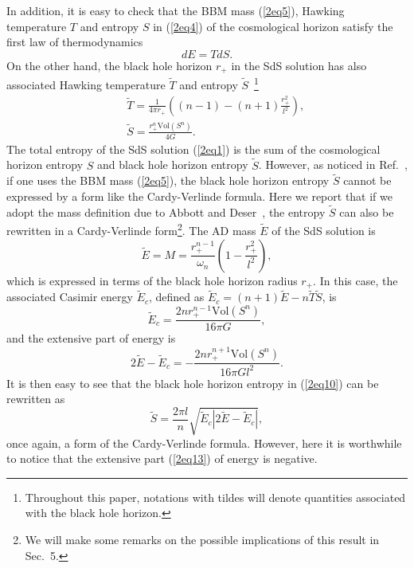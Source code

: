 \documentclass[a4paper,12pt]{article}
\begin{document}
In addition, it is easy to check that the BBM mass (\ref{2eq5}), Hawking temperature $T$
and entropy $S$ in (\ref{2eq4}) of the cosmological horizon satisfy the first law of 
thermodynamics 
\begin{equation}
\label{2eq9}
dE=TdS.
\end{equation}
On the other hand, the black hole horizon $r_+$ in the SdS solution has also associated 
Hawking temperature $\tilde T$ and entropy $\tilde S$~\footnote{Throughout this paper,
notations with tildes will denote quantities associated with the black hole horizon.}
\begin{eqnarray}
\label{2eq10}
&& \tilde T=\frac{1}{4\pi r_+}\left ( (n-1) -(n+1)\frac{r_+^2}{l^2}\right), 
   \nonumber \\
&& \tilde S=\frac{r_+^n \mbox{Vol}(S^n)}{4G}.
\end{eqnarray}
The total entropy of the SdS solution (\ref{2eq1}) is the sum of the cosmological
horizon entropy $S$ and black hole horizon entropy $\tilde S$. However, as noticed
in Ref.~\cite{Cai1}, if one uses the BBM mass (\ref{2eq5}), the black hole horizon entropy
$\tilde S$ cannot be expressed by a form like the Cardy-Verlinde formula. Here we report
that if we adopt the mass definition due to Abbott and Deser~\cite{AD},  the entropy $\tilde S$
can also be rewritten in a Cardy-Verlinde form\footnote{We will make some remarks on the 
possible implications of this result in Sec.~5.}. The AD mass $\tilde E$ of the SdS solution 
is~\cite{AD} 
\begin{equation}
\label{2eq11}
\tilde E =M=\frac{r_+^{n-1}}{\omega_n}\left(1-\frac{r_+^2}{l^2}\right),
\end{equation}
which is expressed in terms of the black hole horizon radius $r_+$.
 In this case, the associated 
Casimir energy $\tilde E_c$, defined as $\tilde E_c =(n+1)\tilde E-n\tilde T \tilde S$,
is
\begin{equation}
\label{2eq12}
\tilde E_c =\frac{2n r_+^{n-1}\mbox{Vol}(S^n)}{16\pi G},
\end{equation}
and the extensive part of energy is 
\begin{equation}
\label{2eq13}
2\tilde E-\tilde E_c =-\frac{2nr_+^{n+1} \mbox{Vol}(S^n)}{16\pi G l^2}.
\end{equation}
It is then easy to see that the black hole horizon entropy in (\ref{2eq10}) can 
be rewritten as
\begin{equation}
\label{2eq14}
\tilde S= \frac{2\pi l}{n}\sqrt{\tilde E_c|2\tilde E-\tilde E_c|},
\end{equation}
once again, a form of the Cardy-Verlinde formula. However, here it is worthwhile to notice
that the extensive part (\ref{2eq13}) of energy is negative. 
\end{document}
